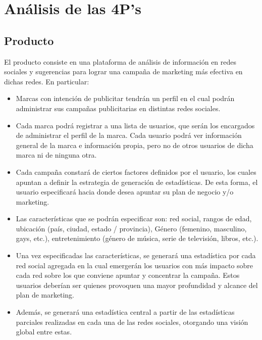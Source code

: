 \documentclass[oneside]{book}
\begin{document}
\newpage



\section{An\'{a}lisis de las 4P's}

\subsection{Producto}
El producto consiste en una plataforma de an\'{a}lisis de informaci\'{o}n en redes sociales y sugerencias para lograr una campa\~{n}a de marketing m\'{a}s efectiva en dichas redes.
En particular:

\begin{itemize}
\item Marcas con intenci\'{o}n de publicitar tendr\'{a}n un perfil en el cual podr\'{a}n administrar sus campañas publicitarias en distintas redes sociales.

\item Cada marca podr\'{a} registrar a una lista de usuarios, que ser\'{a}n los encargados de administrar el perfil de la marca. Cada usuario podr\'{a} ver informaci\'{o}n general de la marca e informaci\'{o}n propia, pero no de otros usuarios de dicha marca ni de ninguna otra. 

\item Cada campa\~{n}a constar\'{a} de ciertos factores definidos por el usuario, los cuales apuntan a definir la estrategia de generaci\'{o}n de estad\'{i}sticas. De esta forma, el usuario especificar\'{a} hacia donde desea apuntar su plan de negocio y/o marketing.

\item Las caracter\'{i}sticas que se podrán especificar son: red social, rangos de edad, ubicación (pa\'{i}s, ciudad, estado / provincia), Género (femenino, masculino, gays, etc.), entretenimiento (g\'{e}nero de música, serie de televisi\'{o}n, libros, etc.).

\item Una vez especificadas las caracter\'{i}sticas, se generar\'{a} una estad\'{i}stica por cada red social agregada en la cual emerger\'{a}n los usuarios con m\'{a}s impacto sobre cada red sobre los que conviene apuntar y concentrar la campa\~{n}a. Estos usuarios deber\'{i}an ser quienes provoquen una mayor profundidad y alcance del plan de marketing. 

\item Adem\'{a}s, se generará una estad\'{i}stica central a partir de las estad\'{i}sticas parciales realizadas en cada una de las redes sociales, otorgando una visi\'{o}n global entre estas.


\end{itemize}
\end{document}
